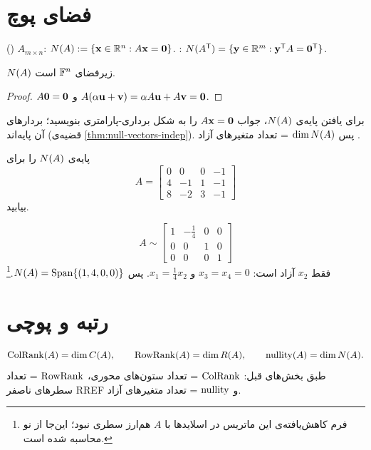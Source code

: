 \section{فضای پوچ}

\begin{definition}
 () $A_{m\times n}$:
$N(A):=\{\mathbf{x}\in\mathbb{R}^n: A\mathbf{x}=\mathbf{0}\}$.
:
$N(A^{\mathsf{T}})=\{\mathbf{y}\in\mathbb{R}^m: \mathbf{y}^{\mathsf{T}} A=\mathbf{0}^{\mathsf{T}}\}$.
\end{definition}

\begin{theorem}\label{thm:null-subspace}
$N(A)$ زیرفضای $\mathbb{F}^n$ است.
\end{theorem}
\begin{proof}
$A\mathbf{0}=\mathbf{0}$ و $A(\alpha\mathbf{u}+\mathbf{v})=\alpha A\mathbf{u}+A\mathbf{v}=\mathbf{0}$.
\end{proof}

برای یافتن پایه‌ی $N(A)$، جواب $A\mathbf{x}=\mathbf{0}$ را به شکل برداری-پارامتری بنویسید؛ بردارهای آن پایه‌اند (قضیه‌ی \ref{thm:null-vectors-indep}). پس $\dim N(A)$ = تعداد متغیرهای آزاد .

\begin{example}
پایه‌ی $N(A)$ را برای 
\[
A=\begin{bmatrix}0&0&0&-1\\4&-1&1&-1\\8&-2&3&-1\end{bmatrix}
\]
 بیابید.
\end{example}
\begin{solution}
 
\[
A\sim\begin{bmatrix}1&-\frac14&0&0\\0&0&1&0\\0&0&0&1\end{bmatrix}
\]
فقط $x_2$ آزاد است: $x_3=x_4=0$ و $x_1=\frac14x_2$. پس $N(A)=\operatorname{Span}\{(1,4,0,0)\}$.\footnote{فرم کاهش‌یافته‌ی این ماتریس در اسلایدها با $A$ هم‌ارز سطری نبود؛ این‌جا از نو محاسبه شده است.}
\end{solution}

\section{رتبه و پوچی}

\begin{definition}
\[
\operatorname{ColRank}(A)=\dim C(A),\qquad \operatorname{RowRank}(A)=\dim R(A),\qquad \operatorname{nullity}(A)=\dim N(A).
\]
طبق بخش‌های قبل: $\operatorname{ColRank}$ = تعداد ستون‌های محوری، $\operatorname{RowRank}$ = تعداد سطرهای ناصفر RREF و $\operatorname{nullity}$ = تعداد متغیرهای آزاد.
\end{definition}

